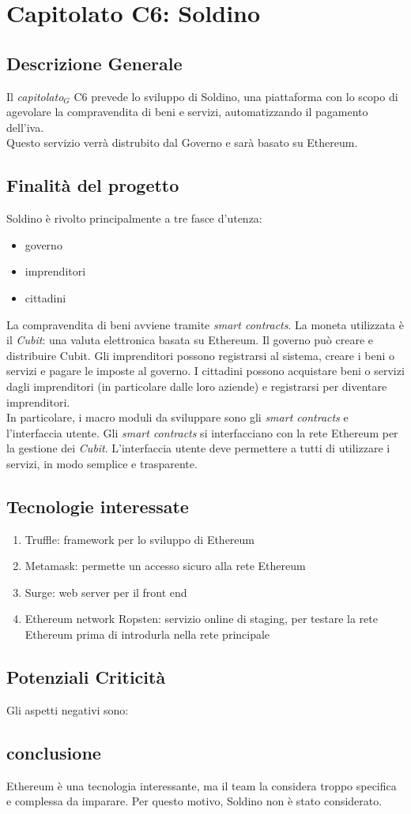 \chapter{Capitolato C6: Soldino}
\section{Descrizione Generale}

Il \textit{capitolato$_{G}$} C6 prevede lo sviluppo di Soldino, una piattaforma con lo scopo di agevolare la compravendita di beni e servizi, automatizzando il pagamento dell'iva.\\
Questo servizio verrà distrubito dal Governo e sarà basato su Ethereum. 


\section{Finalit\`a del progetto}
Soldino è rivolto principalmente a tre fasce d'utenza:
\begin{itemize}
	\item governo
	\item imprenditori
	\item cittadini
\end{itemize}
La compravendita di beni avviene tramite \textit{smart contracts}. La moneta utilizzata è il \textit{Cubit}: una valuta elettronica basata su Ethereum.
Il governo può creare e distribuire Cubit. Gli imprenditori possono registrarsi al sistema, creare i beni o servizi e pagare le imposte al governo. I cittadini possono acquistare beni o servizi dagli imprenditori (in particolare dalle loro aziende) e registrarsi per diventare imprenditori.\\
In particolare, i macro moduli da sviluppare sono gli \textit{smart contracts} e l'interfaccia utente. Gli \textit{smart contracts} si interfacciano con la rete Ethereum per la gestione dei \textit{Cubit}. L'interfaccia utente deve permettere a tutti di utilizzare i servizi, in modo semplice e trasparente.


\section{Tecnologie interessate}
\begin{enumerate}
	\item Truffle: framework per lo sviluppo di Ethereum
	\item Metamask: permette un accesso sicuro alla rete Ethereum
	\item Surge: web server per il front end
	\item Ethereum network Ropsten: servizio online di staging, per testare la rete Ethereum prima di introdurla nella rete principale
	
\end{enumerate}
\section{Potenziali Criticità}
Gli aspetti negativi sono:
\section{conclusione}
Ethereum è una tecnologia interessante, ma il team la considera troppo specifica e complessa da imparare. Per questo motivo, Soldino non è stato considerato. 